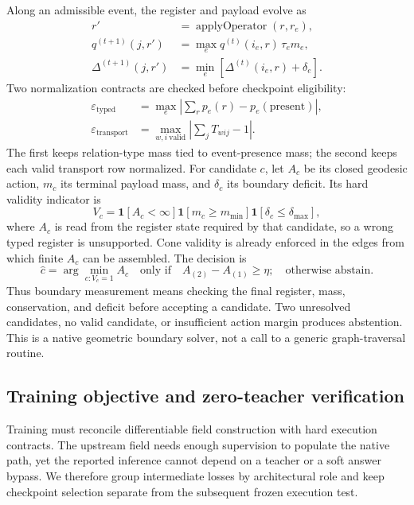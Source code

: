 \documentclass[11pt]{article}
\begin{document}
Along an admissible event, the register and payload evolve as
\begin{align}
r' &= \operatorname{applyOperator}(r,r_e),\\
q^{(t+1)}(j,r') &= \max_e q^{(t)}(i_e,r)\,\tau_e m_e,\\
\Delta^{(t+1)}(j,r') &= \min_e
             \left[\Delta^{(t)}(i_e,r)+\delta_e\right].
\end{align}
Two normalization contracts are checked before checkpoint eligibility:
\begin{align}
\varepsilon_{\mathrm{typed}}
  &=\max_e\left|\sum_r p_e(r)-p_e(\mathrm{present})\right|,\\
\varepsilon_{\mathrm{transport}}
  &=\max_{w,i\ \mathrm{valid}}\left|\sum_j T_{wij}-1\right|.
\label{eq:conservation}
\end{align}
The first keeps relation-type mass tied to event-presence mass; the second
keeps each valid transport row normalized. For candidate $c$, let $A_c$ be its
closed geodesic action, $m_c$ its terminal payload mass, and $\delta_c$ its
boundary deficit. Its hard validity indicator is
\begin{equation}
V_c=\mathbf{1}[A_c<\infty]
    \mathbf{1}[m_c\ge m_{\min}]
    \mathbf{1}[\delta_c\le\delta_{\max}],
\label{eq:validity}
\end{equation}
where $A_c$ is read from the register state required by that candidate, so a
wrong typed register is unsupported. Cone validity is already enforced in the
edges from which finite $A_c$ can be assembled.
The decision is
\begin{equation}
\widehat c=\arg\min_{c:V_c=1}A_c
\quad\text{only if}\quad
A_{(2)}-A_{(1)}\ge\eta;
\quad\text{otherwise abstain}.
\label{eq:decision}
\end{equation}
Thus boundary measurement means checking the final register, mass,
conservation, and deficit before accepting a candidate. Two unresolved
candidates, no valid candidate, or insufficient action margin produces
abstention. This is a native geometric boundary solver, not a call to a generic
graph-traversal routine.

\subsection{Training objective and zero-teacher verification}

Training must reconcile differentiable field construction with hard execution
contracts. The upstream field needs enough supervision to populate the native
path, yet the reported inference cannot depend on a teacher or a soft answer
bypass. We therefore group intermediate losses by architectural role and keep
checkpoint selection separate from the subsequent frozen execution test.
\end{document}
